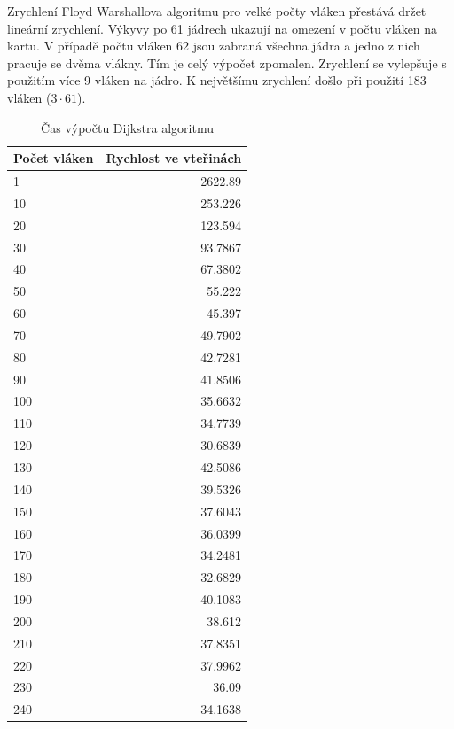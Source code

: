 \documentclass[10pt,a4paper]{article}
\begin{document}
Zrychlení Floyd Warshallova algoritmu pro velké počty vláken přestává držet lineární zrychlení. Výkyvy po 61 jádrech ukazují na omezení v počtu vláken na kartu. V případě počtu vláken 62 jsou zabraná všechna jádra a jedno z nich pracuje se dvěma vlákny. Tím je celý výpočet zpomalen. Zrychlení se vylepšuje s použitím více 9 vláken na jádro. K největšímu zrychlení došlo při použití 183 vláken ($3 \cdot 61$).

\begin{table}[H]
  \centering
	\caption{Čas výpočtu Dijkstra algoritmu}
	\begin{tabular}{| l | r |}
\hline
Počet vláken & Rychlost ve vteřinách \\ \hline
1 & 2622.89 \\ \hline
10 & 253.226 \\ \hline
20 & 123.594 \\ \hline
30 & 93.7867 \\ \hline
40 & 67.3802 \\ \hline
50 & 55.222 \\ \hline
60 & 45.397 \\ \hline
70 & 49.7902 \\ \hline
80 & 42.7281 \\ \hline
90 & 41.8506 \\ \hline
100 & 35.6632 \\ \hline
110 & 34.7739 \\ \hline
120 & 30.6839 \\ \hline
130 & 42.5086 \\ \hline
140 & 39.5326 \\ \hline
150 & 37.6043 \\ \hline
160 & 36.0399 \\ \hline
170 & 34.2481 \\ \hline
180 & 32.6829 \\ \hline
190 & 40.1083 \\ \hline
200 & 38.612 \\ \hline
210 & 37.8351 \\ \hline
220 & 37.9962 \\ \hline
230 & 36.09 \\ \hline
240 & 34.1638 \\ \hline

	\end{tabular}
  \label{tab:daph}
\end{table}
\end{document}
